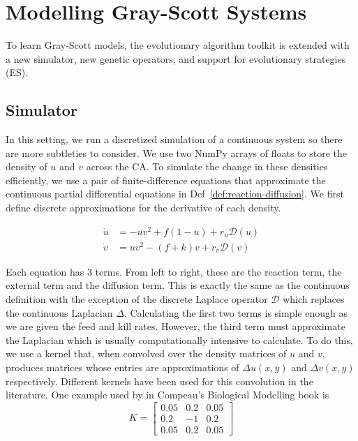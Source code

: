 \chapter{Modelling Gray-Scott Systems} \label{gray-scott}

To learn Gray-Scott models, the evolutionary algorithm toolkit is extended with a new simulator, new genetic operators, and support for evolutionary strategies (ES).

\section{Simulator} \label{subsec:simulator}

In this setting, we run a discretized simulation of a continuous system so there are more subtleties to consider. We use two NumPy arrays of floats to store the density of $u$ and $v$ across the CA. To simulate the change in these densities efficiently, we use a pair of finite-difference equations that approximate the continuous partial differential equations in Def~\ref{def:reaction-diffusion}. We first define discrete approximations for the derivative of each density.
\begin{definition}\label{def:gs}
\begin{align*}
  \dot{u} &= -uv^2 + f(1-u) + r_u \mathcal{D}(u)\\
  \dot{v} &= uv^2 - (f+k)v + r_v \mathcal{D}(v)
\end{align*}
\end{definition}
Each equation has 3 terms. From left to right, these are the reaction term, the external term and the diffusion term. This is exactly the same as the continuous definition with the exception of the discrete Laplace operator $\mathcal{D}$ which replaces the continuous Laplacian $\Delta$. Calculating the first two terms is simple enough as we are given the feed and kill rates.  However, the third term must approximate the Laplacian which is usually computationally intensive to calculate. To do this, we use a kernel that, when convolved over the density matrices of $u$ and $v$, produces matrices whose entries are approximations of $\Delta u(x,y)$ and $\Delta v(x,y)$ respectively. Different kernels have been used for this convolution in the literature. One example used by in Compeau's Biological Modelling book\cite{compeau} is
\[
  K= \begin{bmatrix}
    0.05 & 0.2 & 0.05\\
    0.2 & -1 & 0.2\\
    0.05 & 0.2 & 0.05
  \end{bmatrix}
\]
